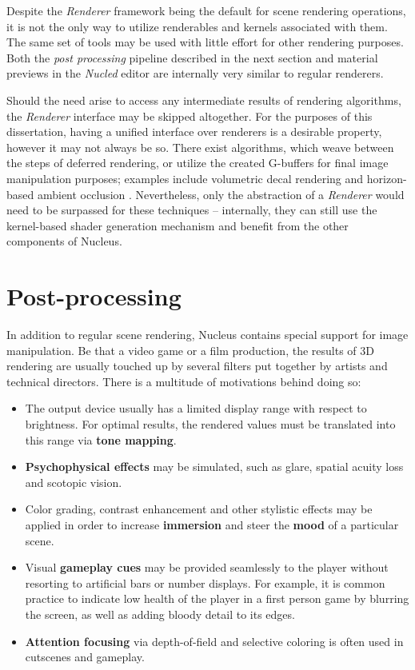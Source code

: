 Despite the \emph{Renderer} framework being the default for scene rendering operations, it is not the only way to utilize renderables and kernels associated with them. The same set of tools may be used with little effort for other rendering purposes. Both the \emph{post processing} pipeline described in the next section and material previews in the \emph{Nucled} editor are internally very similar to regular renderers.

Should the need arise to access any intermediate results of rendering algorithms, the \emph{Renderer} interface may be skipped altogether. For the purposes of this dissertation, having a unified interface over renderers is a desirable property, however it may not always be so. There exist algorithms, which weave between the steps of deferred rendering, or utilize the created G-buffers for final image manipulation purposes; examples include volumetric decal rendering \cite{VolumeDecals} and horizon-based ambient occlusion \cite{HBAO}. Nevertheless, only the abstraction of a \emph{Renderer} would need to be surpassed for these techniques -- internally, they can still use the kernel-based shader generation mechanism and benefit from the other components of Nucleus.

\section{Post-processing}
\label{sec:PostProcessing}

In addition to regular scene rendering, Nucleus contains special support for image manipulation. Be that a video game or a film production, the results of 3D rendering are usually touched up by several filters put together by artists and technical directors. There is a multitude of motivations behind doing so:

\begin{itemize}
\item The output device usually has a limited display range with respect to brightness. For optimal results, the rendered values must be translated into this range via \textbf{tone mapping}.
\item \textbf{Psychophysical effects} may be simulated, such as glare, spatial acuity loss and scotopic vision.
\item Color grading, contrast enhancement and other stylistic effects may be applied in order to increase \textbf{immersion} and steer the \textbf{mood} of a particular scene.
\item Visual \textbf{gameplay cues} may be provided seamlessly to the player without resorting to artificial bars or number displays. For example, it is common practice to indicate low health of the player in a first person game by blurring the screen, as well as adding bloody detail to its edges.
\item \textbf{Attention focusing} via depth-of-field and selective coloring is often used in cutscenes and gameplay.
\end{itemize}

